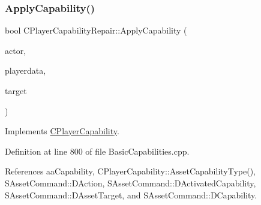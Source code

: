 \subsubsection{\texorpdfstring{Apply\+Capability()}{ApplyCapability()}}
{\footnotesize\ttfamily bool C\+Player\+Capability\+Repair\+::\+Apply\+Capability (\begin{DoxyParamCaption}\item[{std\+::shared\+\_\+ptr$<$ \hyperlink{classCPlayerAsset}{C\+Player\+Asset} $>$}]{actor,  }\item[{std\+::shared\+\_\+ptr$<$ \hyperlink{classCPlayerData}{C\+Player\+Data} $>$}]{playerdata,  }\item[{std\+::shared\+\_\+ptr$<$ \hyperlink{classCPlayerAsset}{C\+Player\+Asset} $>$}]{target }\end{DoxyParamCaption})\hspace{0.3cm}{\ttfamily [virtual]}}



Implements \hyperlink{classCPlayerCapability_a2ca6fd7fbd9c0178f1cf1d049c63825f}{C\+Player\+Capability}.



Definition at line 800 of file Basic\+Capabilities.\+cpp.



References aa\+Capability, C\+Player\+Capability\+::\+Asset\+Capability\+Type(), S\+Asset\+Command\+::\+D\+Action, S\+Asset\+Command\+::\+D\+Activated\+Capability, S\+Asset\+Command\+::\+D\+Asset\+Target, and S\+Asset\+Command\+::\+D\+Capability.


